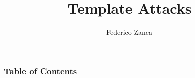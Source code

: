\documentclass{beamer}
\title[Power Analysis Side-channel Attacks] %
{Template Attacks}
\subtitle{}
\author[Federico Zanca] %
{Federico Zanca}
\institute[] %
{
  Computer Science and Engineering\\
  Politecnico di Milano
}
\date[2025] %
{}
\begin{document}
\frame{\titlepage}


\begin{frame}
\frametitle{Table of Contents}
\tableofcontents
\end{frame}






\end{document}
